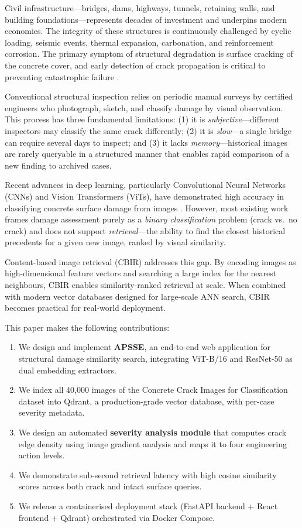 \documentclass[conference]{IEEEtran}
\begin{document}
Civil infrastructure---bridges, dams, highways, tunnels, retaining walls, and building foundations---represents decades of investment and underpins modern economies. The integrity of these structures is continuously challenged by cyclic loading, seismic events, thermal expansion, carbonation, and reinforcement corrosion. The primary symptom of structural degradation is surface cracking of the concrete cover, and early detection of crack propagation is critical to preventing catastrophic failure \cite{ref_bridge_inspection}.

Conventional structural inspection relies on periodic manual surveys by certified engineers who photograph, sketch, and classify damage by visual observation. This process has three fundamental limitations: (1) it is \textit{subjective}---different inspectors may classify the same crack differently; (2) it is \textit{slow}---a single bridge can require several days to inspect; and (3) it lacks \textit{memory}---historical images are rarely queryable in a structured manner that enables rapid comparison of a new finding to archived cases.

Recent advances in deep learning, particularly Convolutional Neural Networks (CNNs) and Vision Transformers (ViTs), have demonstrated high accuracy in classifying concrete surface damage from images \cite{ref_crack_cnn, ref_vit_original}. However, most existing work frames damage assessment purely as a \textit{binary classification} problem (crack vs.\ no crack) and does not support \textit{retrieval}---the ability to find the closest historical precedents for a given new image, ranked by visual similarity.

Content-based image retrieval (CBIR) \cite{ref_cbir} addresses this gap. By encoding images as high-dimensional feature vectors and searching a large index for the nearest neighbours, CBIR enables similarity-ranked retrieval at scale. When combined with modern vector databases designed for large-scale ANN search, CBIR becomes practical for real-world deployment.

This paper makes the following contributions:
\begin{enumerate}[leftmargin=*, label=\arabic*)]
  \item We design and implement \textbf{APSSE}, an end-to-end web application for structural damage similarity search, integrating ViT-B/16 and ResNet-50 as dual embedding extractors.
  \item We index all 40,000 images of the Concrete Crack Images for Classification dataset \cite{ref_dataset} into Qdrant, a production-grade vector database, with per-case severity metadata.
  \item We design an automated \textbf{severity analysis module} that computes crack edge density using image gradient analysis and maps it to four engineering action levels.
  \item We demonstrate sub-second retrieval latency with high cosine similarity scores across both crack and intact surface queries.
  \item We release a containerised deployment stack (FastAPI backend + React frontend + Qdrant) orchestrated via Docker Compose.
\end{enumerate}
\end{document}

